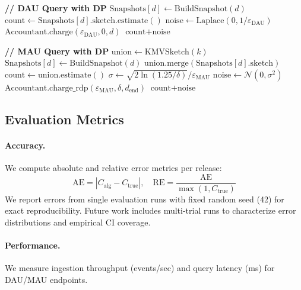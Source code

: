 \documentclass[11pt]{article}
\begin{document}
\begin{algorithm}[H]
\begin{algorithmic}[1]
\Statex
\Statex \textbf{// DAU Query with DP}
        \State $\text{Snapshots}[d] \gets \text{BuildSnapshot}(d)$
    \EndIf
    \State $\text{count} \gets \text{Snapshots}[d].\text{sketch.estimate}()$
    \State $\text{noise} \gets \text{Laplace}(0, 1/\varepsilon_{\text{DAU}})$
    \State $\text{Accountant.charge}(\varepsilon_{\text{DAU}}, 0, d)$
    \State \Return $\text{count} + \text{noise}$
\EndFunction

\Statex
\Statex \textbf{// MAU Query with DP}
    \State $\text{union} \gets \text{KMVSketch}(k)$
            \State $\text{Snapshots}[d] \gets \text{BuildSnapshot}(d)$
        \EndIf
        \State $\text{union.merge}(\text{Snapshots}[d].\text{sketch})$
    \EndFor
    \State $\text{count} \gets \text{union.estimate}()$
    \State $\sigma \gets \sqrt{2 \ln(1.25/\delta)} / \varepsilon_{\text{MAU}}$
    \State $\text{noise} \gets \mathcal{N}(0, \sigma^2)$
    \State $\text{Accountant.charge\_rdp}(\varepsilon_{\text{MAU}}, \delta, d_{\text{end}})$
    \State \Return $\text{count} + \text{noise}$
\EndFunction
\end{algorithmic}
\end{algorithm}

\subsection{Evaluation Metrics}

\paragraph{Accuracy.} We compute absolute and relative error metrics per release:
\[
\text{AE} = |C_{\text{alg}} - C_{\text{true}}|, \quad
\text{RE} = \frac{\text{AE}}{\max(1, C_{\text{true}})}
\]
We report errors from single evaluation runs with fixed random seed (42) for exact reproducibility. Future work includes multi-trial runs to characterize error distributions and empirical CI coverage.

\paragraph{Performance.} We measure ingestion throughput (events/sec) and query latency (ms) for DAU/MAU endpoints.

\newpage
\end{document}
